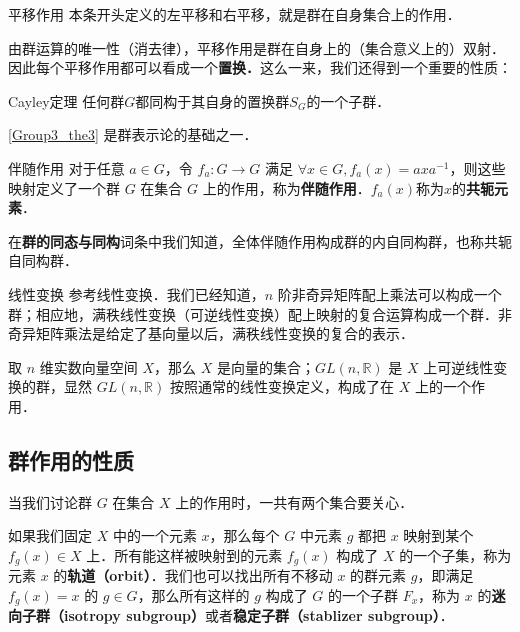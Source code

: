 \begin{example}{平移作用}\label{Group3_ex1}
本条开头定义的左平移和右平移，就是群在自身集合上的作用．
\end{example}

由群运算的唯一性（消去律），平移作用是群在自身上的（集合意义上的）双射．因此每个平移作用都可以看成一个\textbf{置换．}这么一来，我们还得到一个重要的性质：

\begin{theorem}{Cayley定理}\label{Group3_the3}
任何群$G$都同构于其自身的置换群$S_G$的一个子群．
\end{theorem}

\autoref{Group3_the3} 是群表示论的基础之一．

\begin{example}{伴随作用}\label{Group3_ex2}
对于任意 $a\in G$，令 $f_a: G\rightarrow G$ 满足 $\forall x\in G, f_a(x)=axa^{-1}$，则这些映射定义了一个群 $G$ 在集合 $G$ 上的作用，称为\textbf{伴随作用}．$f_a(x)$称为$x$的\textbf{共轭元素}．

在\textbf{群的同态与同构}词条中我们知道，全体伴随作用构成群的内自同构群，也称共轭自同构群．
\end{example}

\begin{example}{线性变换}\label{Group3_ex3}
参考线性变换．我们已经知道，$n$ 阶非奇异矩阵配上乘法可以构成一个群；相应地，满秩线性变换（可逆线性变换）配上映射的复合运算构成一个群．非奇异矩阵乘法是给定了基向量以后，满秩线性变换的复合的表示．

取 $n$ 维实数向量空间 $X$，那么 $X$ 是向量的集合；$GL(n,\mathbb{R})$ 是 $X$ 上可逆线性变换的群，显然 $GL(n,\mathbb{R})$ 按照通常的线性变换定义，构成了在 $X$ 上的一个作用．
\end{example}

\subsection{群作用的性质}

当我们讨论群 $G$ 在集合 $X$ 上的作用时，一共有两个集合要关心．

如果我们固定 $X$ 中的一个元素 $x$，那么每个 $G$ 中元素 $g$ 都把 $x$ 映射到某个 $f_g(x)\in X$ 上．所有能这样被映射到的元素 $f_g(x)$ 构成了 $X$ 的一个子集，称为元素 $x$ 的\textbf{轨道（orbit）}．我们也可以找出所有不移动 $x$ 的群元素 $g$，即满足 $f_g(x)=x$ 的 $g\in G$，那么所有这样的 $g$ 构成了 $G$ 的一个子群 $F_x$，称为 $x$ 的\textbf{迷向子群（isotropy subgroup）}或者\textbf{稳定子群（stablizer subgroup）}．

